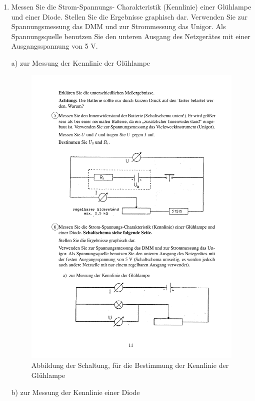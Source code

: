 \documentclass[12pt]{scrartcl}
\begin{document}
\begin{enumerate}
	\item
	Messen Sie die Strom-Spannungs-					Charakteristik (Kennlinie) einer 				Glühlampe und einer Diode. Stellen Sie 			die Ergebnisse graphisch dar. Verwenden 			Sie zur Spannungsmessung das DMM und zur 	Strommessung das Unigor. Als 					Spannungsquelle benutzen Sie den unteren 	Ausgang des Netzgerätes mit einer 				Ausgangsspannung von 5 V.
	
	a) zur Messung der Kennlinie der 				Glühlampe
	
	\begin{figure}[htbp] 
	  \centering
	    \includegraphics[trim = 18mm 15mm 1mm 151mm, clip, scale = 1]{abb_versuch_5_6a.pdf}
	  	\caption[Abbildung der Schaltung, für die Bestimmung der Kennlinie der Glühlampe]{Abbildung der Schaltung, für die Bestimmung der Kennlinie der Glühlampe\footnotemark}
	  \label{fig:abb_versuch_6a}
	\end{figure}
	\newpage
	b) zur Messung der Kennlinie einer Diode
	

\end{enumerate}
\end{document}

